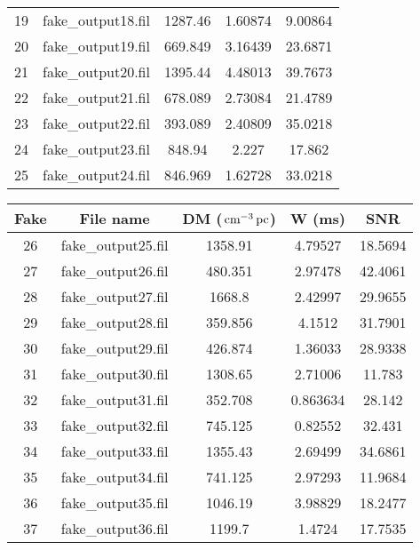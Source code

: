 \begin{sidewaystable}
\begin{minipage}{0.5\textheight}
\begin{tabular}{ccccc}
          19       & fake\_output18.fil &    1287.46    & 1.60874  & 9.00864 \\
          20       & fake\_output19.fil &    669.849    & 3.16439  & 23.6871 \\
          21       & fake\_output20.fil &    1395.44    & 4.48013  & 39.7673 \\
          22       & fake\_output21.fil &    678.089    & 2.73084  & 21.4789 \\
          23       & fake\_output22.fil &    393.089    & 2.40809  & 35.0218 \\
          24       & fake\_output23.fil &    848.94     &  2.227   & 17.862  \\
          25       & fake\_output24.fil &    846.969    & 1.62728  & 33.0218 \\
          \hline
    \end{tabular}
    \end{minipage}%
    \begin{minipage}{0.5\textheight}
    \begin{tabular}{ccccc}
        \hline
          Fake  &   File name   &  DM ($\,\text{cm}^{-3}\,\text{pc}$)  &  W (ms)  &   SNR   \\
        \hline
          26       & fake\_output25.fil &    1358.91    & 4.79527  & 18.5694 \\
          27       & fake\_output26.fil &    480.351    & 2.97478  & 42.4061 \\
          28       & fake\_output27.fil &    1668.8     & 2.42997  & 29.9655 \\
          29       & fake\_output28.fil &    359.856    &  4.1512  & 31.7901 \\
          30       & fake\_output29.fil &    426.874    & 1.36033  & 28.9338 \\
          31       & fake\_output30.fil &    1308.65    & 2.71006  & 11.783  \\
          32       & fake\_output31.fil &    352.708    & 0.863634 & 28.142  \\
          33       & fake\_output32.fil &    745.125    & 0.82552  & 32.431  \\
          34       & fake\_output33.fil &    1355.43    & 2.69499  & 34.6861 \\
          35       & fake\_output34.fil &    741.125    & 2.97293  & 11.9684 \\
          36       & fake\_output35.fil &    1046.19    & 3.98829  & 18.2477 \\
          37       & fake\_output36.fil &    1199.7     &  1.4724  & 17.7535 \\

\end{tabular}
\end{minipage}
\end{sidewaystable}
